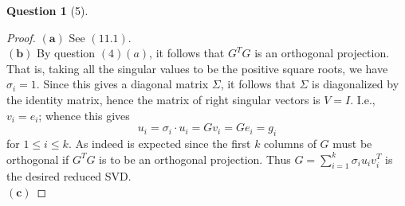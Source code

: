\documentclass[11pt]{article}
\theoremstyle{quest}
\newtheorem*{question}{Question}
\begin{document}
\begin{question}[5]
\end{question}
\begin{proof}
$\mathbf{(a)}$ See $(11.1)$.
\\$\mathbf{(b)}$ By question $(4)(a)$, it follows that $G^TG$ is an orthogonal projection. That is, taking all the singular values to be the positive square roots, we have $\sigma_i  = 1$. Since this gives a diagonal matrix $\Sigma$, it follows that $\Sigma$ is diagonalized by the identity matrix, hence the matrix of right singular vectors is $V = I$. I.e., $v_i = e_i$; whence this gives
$$u_i = \sigma_i \cdot u_i = G v_i = G e_i = g_i$$
for $1 \le i \le k$. As indeed is expected since the first $k$ columns of $G$ must be orthogonal if $G^TG$ is to be an orthogonal projection. Thus $G = \sum_{i=1}^k \sigma_i u_i v_i^T$ is the desired reduced SVD.
\\$\mathbf{(c)}$
\end{proof}
\end{document}
